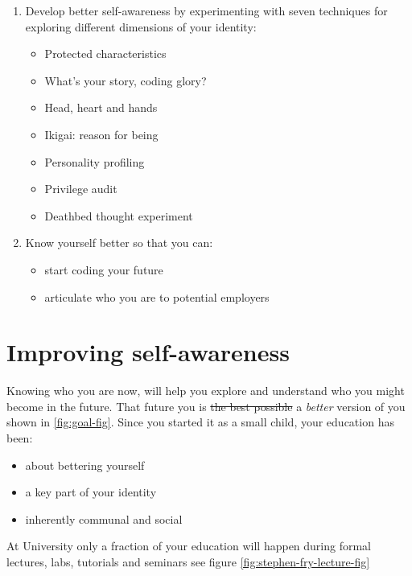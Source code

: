 \documentclass[
]{book}
\providecommand{\tightlist}{%
  \setlength{\itemsep}{0pt}\setlength{\parskip}{0pt}}
\begin{document}
\begin{enumerate}
\def\labelenumi{\arabic{enumi}.}
\tightlist
\item
  Develop better self-awareness by experimenting with seven techniques for exploring different dimensions of your identity:

  \begin{itemize}
  \tightlist
  \item
    Protected characteristics
  \item
    What's your story, coding glory?
  \item
    Head, heart and hands
  \item
    Ikigai: reason for being
  \item
    Personality profiling
  \item
    Privilege audit
  \item
    Deathbed thought experiment
  \end{itemize}
\item
  Know yourself better so that you can:

  \begin{itemize}
  \tightlist
  \item
    start coding your future
  \item
    articulate who you are to potential employers
  \end{itemize}
\end{enumerate}

\hypertarget{skynet}{%
\section{Improving self-awareness}\label{skynet}}

Knowing who you are now, will help you explore and understand who you might become in the future. That future you is \sout{the best possible} a \emph{better} version of you shown in \ref{fig:goal-fig}. Since you started it as a small child, your education has been:

\begin{itemize}
\tightlist
\item
  about bettering yourself
\item
  a key part of your identity
\item
  inherently communal and social
\end{itemize}

At University only a fraction of your education will happen during formal lectures, labs, tutorials and seminars see figure \ref{fig:stephen-fry-lecture-fig}
\end{document}
